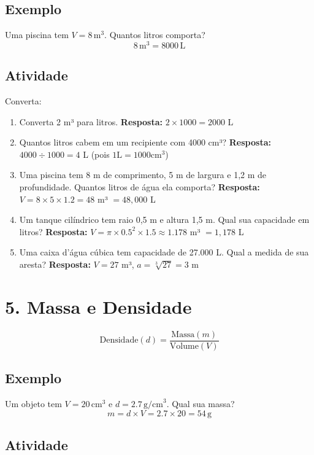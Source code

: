 \documentclass[11pt]{article}
\begin{document}
\begin{multicols}{2}
\subsection*{Exemplo}
Uma piscina tem $V = 8 \, \text{m}^3$. Quantos litros comporta?  
\[
8 \, \text{m}^3 = 8000 \, \text{L}
\]

\subsection*{Atividade}
Converta:
\begin{enumerate}[label=\alph*)]
    \item  Converta 2 m³ para litros.
    \textbf{Resposta:} $2 \times 1000 = 2000$ L
    
    \item  Quantos litros cabem em um recipiente com 4000 cm³?
    \textbf{Resposta:} $4000 \div 1000 = 4$ L (pois $1 \text{L} = 1000 \text{cm}^3$)
    
    \item  Uma piscina tem 8 m de comprimento, 5 m de largura e 1,2 m de profundidade. Quantos litros de água ela comporta?
    \textbf{Resposta:} $V = 8 \times 5 \times 1.2 = 48$ m³ $= 48,000$ L
    
    \item  Um tanque cilíndrico tem raio 0,5 m e altura 1,5 m. Qual sua capacidade em litros?
    \textbf{Resposta:} $V = \pi \times 0.5^2 \times 1.5 \approx 1.178$ m³ $= 1,178$ L
    
    \item  Uma caixa d'água cúbica tem capacidade de 27.000 L. Qual a medida de sua aresta?
    \textbf{Resposta:} $V = 27$ m³, $a = \sqrt[3]{27} = 3$ m
\end{enumerate}

\section*{5. Massa e Densidade}
\[
\text{Densidade} (d) = \frac{\text{Massa} (m)}{\text{Volume} (V)}
\]

\subsection*{Exemplo}
Um objeto tem $V = 20 \, \text{cm}^3$ e $d = 2.7 \, \text{g/cm}^3$. Qual sua massa?  
\[
m = d \times V = 2.7 \times 20 = 54 \, \text{g}
\]

\subsection*{Atividade}


\end{multicols}
\end{document}
